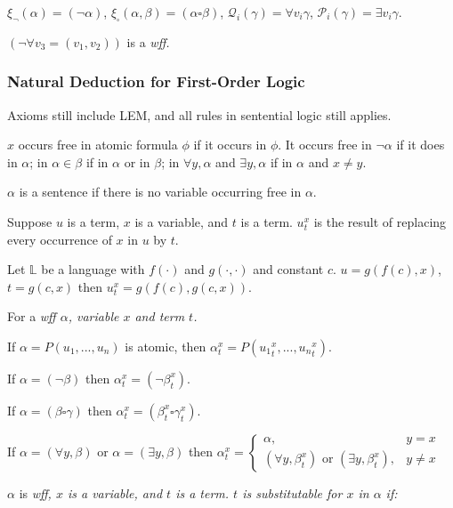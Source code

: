 \documentclass{article}
\begin{document}
	$\xi_{\neg} (\alpha) = (\neg \alpha)$, $\xi_{\square}(\alpha, \beta) = (\alpha \square \beta)$, $\mathcal{Q}_i(\gamma) = \forall v_i \gamma$, $\mathcal{P}_i (\gamma) = \exists v_i \gamma$.
	
	\eg $(\neg \forall v_3 =(v_1,v_2))$ is a \it{wff}.



\subsubsection{Natural Deduction for First-Order Logic}

Axioms still include LEM, and all rules in sentential logic still applies.

	$x$ occurs free in atomic formula $\phi$ if it occurs in $\phi$. It occurs free in $\neg\alpha$ if it does in $\alpha$; in $\alpha\in\beta$ if in $\alpha$ or in $\beta$; in $\forall y, \alpha$ and $\exists y, \alpha$ if in $\alpha$ and $x \ne y$.

	$\alpha$ is a sentence if there is no variable occurring free in $\alpha$.

	Suppose $u$ is a term, $x$ is a variable, and $t$ is a term. $u_t^x$ is the result of replacing every occurrence of $x$ in $u$ by $t$.

\eg Let $\mathbb{L}$ be a language with $f(\cdot)$ and $g(\cdot,\cdot)$ and constant $c$. $u=g(f(c),x)$, $t=g(c,x)$ then $u_t^x = g(f(c), g(c,x))$.

	For a \it{wff} $\alpha$, variable $x$ and term $t$.
	
		 If $\alpha=P(u_1,...,u_n)$ is atomic, then $\alpha_t^x=P({u_1}_t^x, ..., {u_n}_t^x)$.

		 If $\alpha = (\neg \beta)$ then $\alpha_t^x = (\neg\beta_t^x)$.

		 If $\alpha=(\beta\square\gamma)$ then $\alpha_t^x = (\beta_t^x \square \gamma_t^x)$.

		 If $\alpha=(\forall y, \beta)$ or $\alpha=(\exists y, \beta)$ then $\alpha_t^x = \begin{cases} \alpha, & y=x \\ (\forall y, \beta_t^x) \text{ or } (\exists y, \beta_t^x), & y \ne x \end{cases}$


	$\alpha$ is \it{wff}, $x$ is a variable, and $t$ is a term. $t$ is substitutable for $x$ in $\alpha$ if:
	
\end{document}
